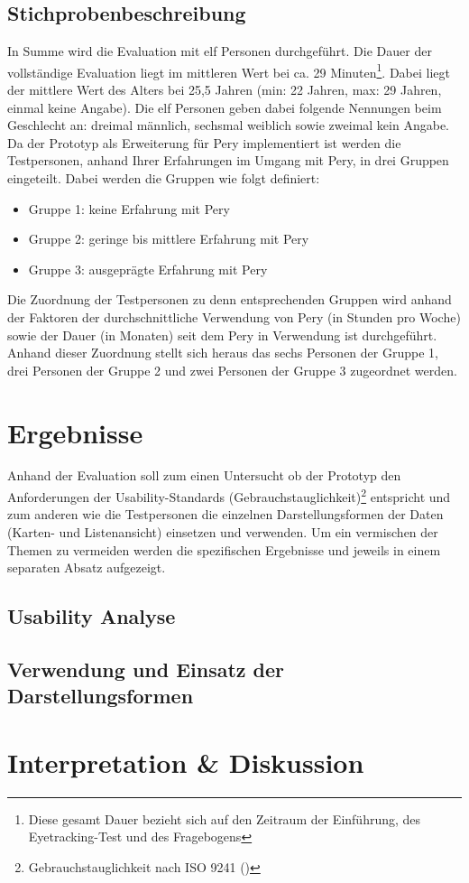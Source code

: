 \documentclass[Bachelorarbeit.tex]{subfiles}
\begin{document}
\subsection{Stichprobenbeschreibung}
\label{Stichproben}
In Summe wird die Evaluation mit elf Personen durchgeführt. 
Die Dauer der vollständige Evaluation liegt im mittleren Wert bei ca. 29 Minuten\footnote{Diese gesamt Dauer bezieht sich auf den Zeitraum der Einführung, des Eyetracking-Test und des Fragebogens}.
Dabei liegt der mittlere Wert des Alters bei 25,5 Jahren (min: 22 Jahren, max: 29 Jahren, einmal keine Angabe). 
Die elf Personen geben dabei folgende Nennungen beim Geschlecht an: dreimal männlich, sechsmal weiblich sowie zweimal kein Angabe.
Da der Prototyp als Erweiterung für Pery implementiert ist werden die Testpersonen, anhand Ihrer Erfahrungen im Umgang mit Pery, in drei Gruppen eingeteilt. 
Dabei werden die Gruppen wie folgt definiert: 
\begin{itemize}		
	\item Gruppe 1: keine Erfahrung mit Pery 
	\item Gruppe 2: geringe bis mittlere Erfahrung mit Pery
	\item Gruppe 3: ausgeprägte Erfahrung mit Pery
\end{itemize}
Die Zuordnung der Testpersonen zu denn entsprechenden Gruppen wird anhand der Faktoren der durchschnittliche Verwendung von Pery (in Stunden pro Woche) sowie der Dauer (in Monaten) seit dem Pery in Verwendung ist durchgeführt.
Anhand dieser Zuordnung stellt sich heraus das sechs Personen der Gruppe 1, drei Personen der Gruppe 2 und zwei Personen der Gruppe 3 zugeordnet werden. 


\section{Ergebnisse}
\label{Ergebnisse}
Anhand der Evaluation soll zum einen Untersucht ob der Prototyp den Anforderungen der Usability-Standards (Gebrauchstauglichkeit)\footnote{Gebrauchstauglichkeit nach ISO 9241 (\cite[siehe:][Abs.: 3.1 Gebrauchstauglichkeit]{Iso9241_11})} entspricht und zum anderen wie die Testpersonen die einzelnen Darstellungsformen der Daten (Karten- und Listenansicht) einsetzen und verwenden. 
Um ein vermischen der Themen zu vermeiden werden die spezifischen Ergebnisse  und  jeweils in einem separaten Absatz aufgezeigt.


\subsection{Usability Analyse}
\label{ergebnis_usability}

\subsection{Verwendung und Einsatz der Darstellungsformen }
\label{ergebnis_darstellungsformen}

\section{Interpretation \& Diskussion}
\label{InterpretationDiskussion}
\end{document}
